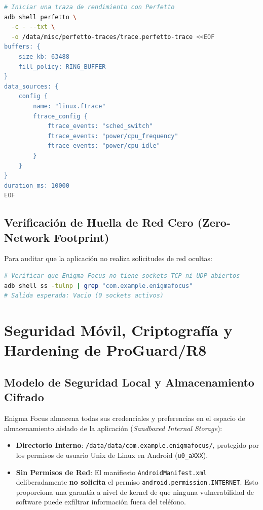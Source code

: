 \documentclass[11pt,a4paper,oneside]{report}
\begin{document}
\begin{lstlisting}[language=bash]
# Iniciar una traza de rendimiento con Perfetto
adb shell perfetto \
  -c - --txt \
  -o /data/misc/perfetto-traces/trace.perfetto-trace <<EOF
buffers: {
    size_kb: 63488
    fill_policy: RING_BUFFER
}
data_sources: {
    config {
        name: "linux.ftrace"
        ftrace_config {
            ftrace_events: "sched_switch"
            ftrace_events: "power/cpu_frequency"
            ftrace_events: "power/cpu_idle"
        }
    }
}
duration_ms: 10000
EOF
\end{lstlisting}

\section{Verificación de Huella de Red Cero (Zero-Network Footprint)}
Para auditar que la aplicación no realiza solicitudes de red ocultas:
\begin{lstlisting}[language=bash]
# Verificar que Enigma Focus no tiene sockets TCP ni UDP abiertos
adb shell ss -tulnp | grep "com.example.enigmafocus"
# Salida esperada: Vacio (0 sockets activos)
\end{lstlisting}

\newpage

\chapter[Seguridad y ProGuard]{Seguridad Móvil, Criptografía y Hardening de ProGuard/R8}

\section{Modelo de Seguridad Local y Almacenamiento Cifrado}
Enigma Focus almacena todas sus credenciales y preferencias en el espacio de almacenamiento aislado de la aplicación (\textit{Sandboxed Internal Storage}):
\begin{itemize}
    \item \textbf{Directorio Interno}: \texttt{/data/data/com.example.enigmafocus/}, protegido por los permisos de usuario Unix de Linux en Android (\texttt{u0\_aXXX}).
    \item \textbf{Sin Permisos de Red}: El manifiesto \texttt{AndroidManifest.xml} deliberadamente \textbf{no solicita} el permiso \texttt{android.permission.INTERNET}. Esto proporciona una garantía a nivel de kernel de que ninguna vulnerabilidad de software puede exfiltrar información fuera del teléfono.
\end{itemize}
\end{document}
